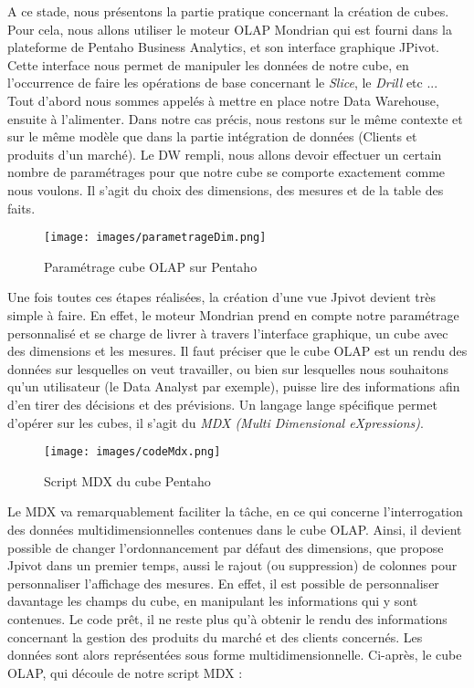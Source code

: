\documentclass[12pt,a4wide,twoside]{report}
\begin{document}
A ce stade, nous présentons la partie pratique concernant la création de cubes. Pour cela, nous allons utiliser le moteur OLAP Mondrian qui est fourni dans la
plateforme de Pentaho Business Analytics, et son interface graphique JPivot. Cette interface nous permet de manipuler les données de notre cube, en l'occurrence de faire les opérations de base concernant le \emph{Slice}, le \emph{Drill} etc ... \newline
Tout d'abord nous sommes appelés à mettre en place notre Data Warehouse, ensuite à l'alimenter. Dans notre cas précis, nous restons sur le même contexte et sur le même modèle que dans la partie intégration de données (Clients et produits d'un marché).\newline
Le DW rempli, nous allons devoir effectuer un certain nombre de paramétrages pour que notre cube se comporte exactement comme nous voulons. Il s'agit du choix des dimensions, des mesures et de la table des faits.\newline
\begin{figure}[!h]
\begin{center}
			\texttt{[image: images/parametrageDim.png]}
\end{center}
\caption{Paramétrage cube OLAP sur Pentaho }
\end{figure} \newpage
Une fois toutes ces étapes réalisées, la création d'une vue Jpivot devient très simple à faire. En effet, le moteur Mondrian prend en compte notre paramétrage personnalisé et se charge de livrer à travers l'interface graphique, un cube avec des dimensions et les mesures.\newline
Il faut préciser que le cube OLAP est un rendu des données sur lesquelles on veut travailler, ou bien sur lesquelles nous souhaitons qu'un utilisateur (le Data Analyst par exemple), puisse lire des informations afin d'en tirer des décisions et des prévisions. Un langage lange spécifique permet d'opérer sur les cubes, il s'agit du \emph{MDX (Multi Dimensional eXpressions)}.\newline
\begin{figure}[!h]
\begin{center}
			\texttt{[image: images/codeMdx.png]}
\end{center}
\caption{Script MDX du cube Pentaho}
\end{figure}


Le MDX va remarquablement faciliter la tâche, en ce qui concerne l'interrogation des données multidimensionnelles contenues dans le cube OLAP. Ainsi, il devient possible de changer l'ordonnancement par défaut des dimensions, que propose Jpivot dans un premier temps, aussi le rajout (ou suppression) de colonnes pour personnaliser l'affichage des mesures. En effet, il est possible de personnaliser davantage les champs du cube, en manipulant les informations qui y sont contenues.\newpage
Le code prêt, il ne reste plus qu'à obtenir le rendu des informations concernant la gestion des produits du marché et des clients concernés. Les données sont alors représentées sous forme multidimensionnelle.\newline
Ci-après, le cube OLAP, qui découle de notre script MDX :
\end{document}
